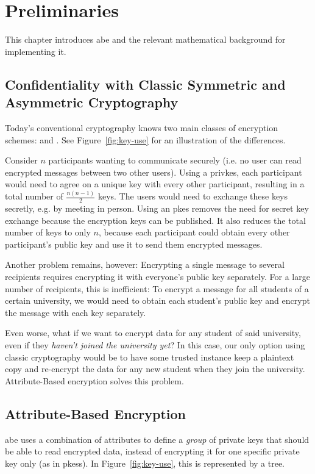 \chapter{Preliminaries}\label{chapter:background}
This chapter introduces \acrlong{abe} and the relevant mathematical background for implementing it.



\section{Confidentiality with Classic Symmetric and Asymmetric Cryptography}
Today's conventional cryptography knows two main classes of encryption schemes:  and . See Figure~\ref{fig:key-use} for an illustration of the differences.

Consider $n$ participants wanting to communicate securely (i.e. no user can read encrypted messages between two other users).
Using a \gls{privkes}, each participant would need to agree on a unique key with every other participant, resulting in a total number of $\frac{n(n-1)}{2}$ keys.
The users would need to exchange these keys secretly, e.g. by meeting in person.
Using an \gls{pkes} removes the need for secret key exchange because the encryption keys can be published.
It also reduces the total number of keys to only $n$, because each participant could obtain every other participant's public key and use it to send them encrypted messages.

Another problem remains, however: Encrypting a single message to several recipients requires encrypting it with everyone's public key separately.
For a large number of recipients, this is inefficient:
To encrypt a message for all students of a certain university, we would need to obtain each student's public key and encrypt the message with each key separately.

Even worse, what if we want to encrypt data for any student of said university, even if they \emph{haven't joined the university yet}?
In this case, our only option using classic cryptography would be to have some trusted instance keep a plaintext copy and re-encrypt the data for any new student when they join the university.
Attribute-Based encryption solves this problem.

\section{Attribute-Based Encryption}\label{sec:background-abe}
\acrfull{abe} uses a combination of attributes to define a \emph{group} of private keys that should be able to read encrypted data, instead of encrypting it for one specific private key only (as in \glspl{pkes}).
In Figure~\ref{fig:key-use}, this is represented by a tree.


